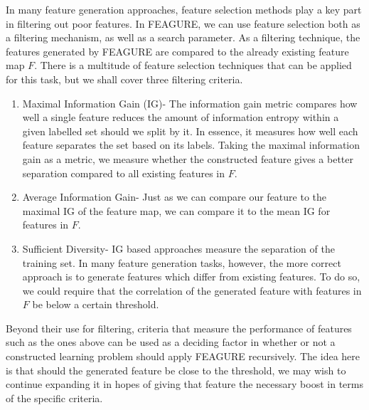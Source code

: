 \documentclass[twoside,11pt]{article}
\theoremstyle{definition}
\begin{document}
In many feature generation approaches, feature selection methods play a key part in filtering out poor features. In FEAGURE, we can use feature selection both as a filtering mechanism, as well as a search parameter.
As a filtering technique, the features generated by FEAGURE are compared to the already existing feature map $F$. There is a multitude of feature selection techniques that can be applied for this task, but we shall cover three filtering criteria.
\begin{enumerate}
	\item Maximal Information Gain (IG)- The information gain metric \cite{quinlan1986} compares how well a single feature reduces the amount of information entropy within a given labelled set should we split by it. In essence, it measures how well each feature separates the set based on its labels. Taking the maximal information gain as a metric, we measure whether the constructed feature gives a better separation compared to all existing features in $F$.
	\item Average Information Gain- Just as we can compare our feature to the maximal IG of the feature map, we can compare it to the mean IG for features in $F$.
	\item Sufficient Diversity- IG based approaches measure the separation of the training set. In many feature generation tasks, however, the more correct approach is to generate features which differ from existing features. To do so, we could require that the correlation of the generated feature with features in $F$ be below a certain threshold.
\end{enumerate}
Beyond their use for filtering, criteria that measure the performance of features such as the ones above can be used as a deciding factor in whether or not a constructed learning problem should apply FEAGURE recursively. The idea here is that should the generated feature be close to the threshold, we may wish to continue expanding it in hopes of giving that feature the necessary boost in terms of the specific criteria.
\end{document}
